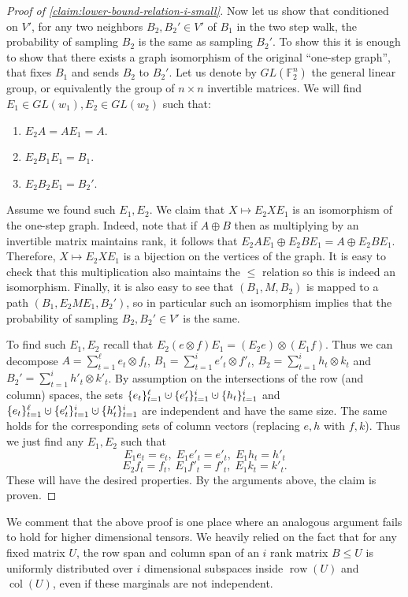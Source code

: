 \documentclass[10pt,a4paper]{article}
\newcommand{\prettyref}[1]{\cref{#1}}
\theoremstyle{definition}
\theoremstyle{remark}
\newcommand{\set}[1]{\{#1\}}
\newcommand{\F}{\mathbb{F}}
\DeclareMathOperator{\row}{row}
\DeclareMathOperator{\col}{col}
\renewcommand{\leq}{\leqslant}
\numberwithin{equation}{section}
\newcommand{\dunion}{\mathbin{\mathaccent\cdot\cup}}
\let\pref=\prettyref
\begin{document}
\begin{proof}[Proof of \pref{claim:lower-bound-relation-i-small}]
Now let us show that conditioned on \(V'\), for any two neighbors \(B_2,B_2' \in V'\) of \(B_1\) in the two step walk, the probability of sampling \(B_2\) is the same as sampling \(B_2'\). To show this it is enough to show that there exists a graph isomorphism of the original ``one-step graph'', that fixes \(B_1\) and sends \(B_2\) to \(B_2'\). Let us denote by \(GL(\F_2^n)\) the general linear group, or equivalently the group of \(n \times n\) invertible matrices. We will find \(E_1 \in GL(w_1), E_2 \in GL(w_2)\) such that:
\begin{enumerate}
    \item \(E_2 A=A E_1 = A\).
    \item \(E_2 B_1 E_1 = B_1\).
    \item \(E_2 B_2 E_1 = B_2'\).
\end{enumerate}
Assume we found such \(E_1,E_2\). We claim that \(X \mapsto E_2 X E_1\) is an isomorphism of the one-step graph. Indeed, note that if \(A \oplus B\) then as multiplying by an invertible matrix maintains rank, it follows that \(E_2 A E_1 \oplus E_2 B E_1= A \oplus E_2 B E_1\). Therefore, \(X \mapsto E_2 X E_1\) is a bijection on the vertices of the graph. It is easy to check that this multiplication also maintains the \(\leq\) relation so this is indeed an isomorphism. Finally, it is also easy to see that \((B_1,M,B_2)\) is mapped to a path \((B_1,E_2 M E_1,B_2')\), so in particular such an isomorphism implies that the probability of sampling \(B_2,B_2' \in V'\) is the same.

To find such \(E_1,E_2\) recall that \(E_2 (e \otimes f) E_1 = (E_2 e) \otimes (E_1 f)\). Thus we can decompose \(A = \sum_{t=1}^\ell e_t \otimes f_t\), \(B_1 = \sum_{t=1}^i e'_t \otimes f'_t\), \(B_2 = \sum_{t=1}^i h_t \otimes k_t\) and \(B_2' = \sum_{t=1}^i h'_t \otimes k'_t\). By assumption on the intersections of the row (and column) spaces, the sets \(\set{e_t}_{t=1}^\ell \dunion \set{e'_t}_{t=1}^i \dunion \set{h_t}_{t=1}^i\) and \(\set{e_t}_{t=1}^\ell \dunion \set{e'_t}_{t=1}^i \dunion \set{h'_t}_{t=1}^i\) are independent and have the same size. The same holds for the corresponding sets of column vectors (replacing \(e,h\) with \(f,k\)). Thus we just find any \(E_1,E_2\) such that
\[E_1 e_t = e_t, \; E_1 e'_t = e'_t, \; E_1 h_t = h'_t\]
\[E_2 f_t = f_t, \; E_1 f'_t = f'_t, \; E_1 k_t = k'_t.\]
These will have the desired properties. By the arguments above, the claim is proven.
\end{proof}
We comment that the above proof is one place where an analogous argument fails to hold for higher dimensional tensors. We heavily relied on the fact that for any fixed matrix \(U\), the row span and column span of an \(i\) rank matrix \(B \leq U\) is uniformly distributed over \(i\) dimensional subspaces inside \(\row(U)\) and \(\col(U)\), even if these marginals are not independent.
\end{document}
